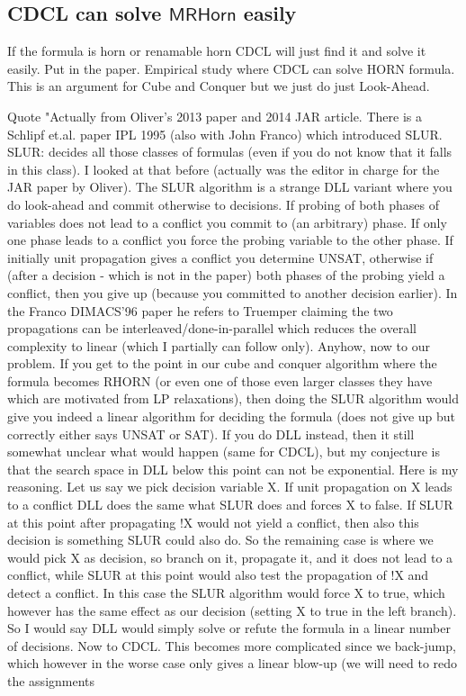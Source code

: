 \documentclass[runningheads]{llncs}
\newcommand{\rhorn}{\mathsf{MRHorn}}
\begin{document}
\subsection{CDCL can solve $\rhorn$ easily}
 If the formula is horn or renamable horn CDCL will just find it and solve it easily. Put in the paper. Empirical study where CDCL can solve HORN formula. This is an argument for Cube and Conquer but we just do just Look-Ahead. 
 
 Quote "Actually from Oliver's 2013 paper and 2014 JAR article.
 There is a Schlipf et.al. paper IPL 1995 (also with John Franco) which introduced SLUR.  
 SLUR: decides all those classes of formulas (even if you do not know that it falls in this class).  I looked at that before (actually was the editor in charge for the JAR paper by Oliver).  The SLUR algorithm is a strange DLL variant where you do look-ahead
 and commit otherwise to decisions. If probing of both phases of variables does not lead to a conflict you commit to (an arbitrary) phase. If only one phase leads to a conflict you force the probing variable to the other phase.  If initially unit propagation gives a conflict
 you determine UNSAT, otherwise if (after a decision - which is not in the paper) both phases of the probing yield a conflict, then you give up (because you committed to another decision earlier).  In the Franco DIMACS'96 paper he refers to Truemper claiming the two propagations can be interleaved/done-in-parallel which reduces the overall complexity to
 linear (which I partially can follow only).  Anyhow, now to our problem.  If you get to the point in our cube and conquer algorithm where the formula becomes RHORN (or even one of those even larger classes they have which are motivated from LP relaxations), then doing the SLUR algorithm would give you indeed a linear algorithm for deciding the formula (does not give up but correctly either says UNSAT or  SAT). If you do DLL instead, then it still somewhat unclear what would happen (same for CDCL), but my conjecture is that the search space in DLL below this point can not be exponential. Here is my reasoning.  Let us say we pick decision variable X.  If unit propagation
 on X leads to a conflict DLL does the same what SLUR does and forces X to false.  If SLUR at this point after propagating !X would not yield a conflict, then also this decision is something SLUR could also do.  So the remaining case is where we would pick X as decision, so branch on it, propagate it, and it does not lead to a conflict, while SLUR at this point
 would also test the propagation of !X and detect a conflict.  In this case the SLUR algorithm would force X to true, which however has the same effect as our decision (setting X to true in the left branch).  So I would say DLL would simply solve or refute the formula in a linear number of decisions.  Now to CDCL.  This becomes more complicated since we back-jump, which however in the worse case only gives a linear blow-up (we will need to redo the assignments
\end{document}

